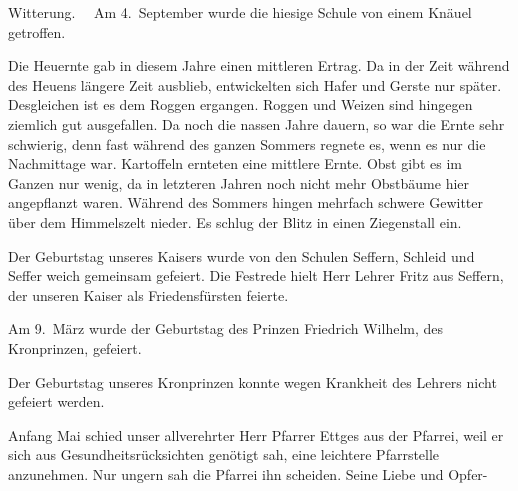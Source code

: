 

%
        Witterung.\ob
~~Am 4.\ September wurde die hiesige Schule\ob
von einem Knäuel\unsicher{} getroffen.~~

\pend
{}
\pstart

Die Heuernte gab in diesem Jahre einen\ob
mittleren Ertrag. Da in der Zeit während des\ob
Heuens längere Zeit ausblieb, entwickelten\ob
sich Hafer und Gerste nur später. Desgleichen ist es\ob
dem Roggen ergangen. Roggen und Weizen sind\ob
hingegen ziemlich gut ausgefallen. Da noch die nassen\ob
Jahre dauern, so war die Ernte sehr schwierig, denn\ob
fast während des ganzen Sommers regnete es, wenn es\ob
nur die Nachmittage war. Kartoffeln ernteten eine\ob
mittlere Ernte. Obst gibt es im Ganzen nur wenig,\ob
da in letzteren Jahren noch nicht mehr Obstbäume\ob
hier angepflanzt waren.\ob
Während des Sommers hingen mehrfach schwere\ob
Gewitter über dem Himmelszelt nieder. Es\ob
schlug der Blitz in einen Ziegenstall ein.

\pend
{}
\pstart

Der Geburtstag unseres Kaisers wurde\ob
von den Schulen Seffern, Schleid und Seffer\ohb
weich gemeinsam gefeiert. Die Festrede\ob
hielt Herr Lehrer Fritz aus Seffern, der\ob
unseren Kaiser als Friedensfürsten feierte.

Am 9.\ März wurde der Geburtstag\ob
des Prinzen Friedrich Wilhelm, des Kronprinzen,\ob
gefeiert.

Der Geburtstag unseres Kronprinzen konnte\ob
wegen Krankheit des Lehrers nicht gefeiert werden.

\pend
{}
\pstart

Anfang Mai schied unser allverehrter Herr\ob
Pfarrer Ettges aus der Pfarrei, weil er sich\ob
aus Gesundheitsrücksichten genötigt sah, eine\ob
leichtere Pfarrstelle anzunehmen. Nur ungern\ob
sah die Pfarrei ihn scheiden. Seine Liebe und Opfer-
\pend
